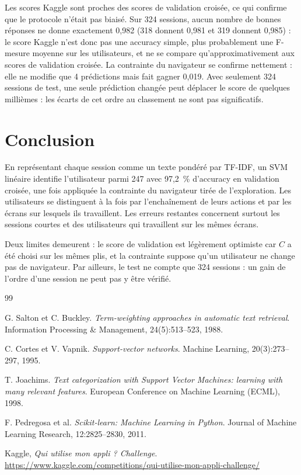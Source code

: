 \documentclass{rapportECL}
\begin{document}
Les scores Kaggle sont proches des scores de validation croisée, ce qui confirme que le protocole n'était pas biaisé. Sur 324 sessions, aucun nombre de bonnes réponses ne donne exactement 0,982 (318 donnent 0,981 et 319 donnent 0,985) : le score Kaggle n'est donc pas une accuracy simple, plus probablement une F-mesure moyenne sur les utilisateurs, et ne se compare qu'approximativement aux scores de validation croisée. La contrainte du navigateur se confirme nettement : elle ne modifie que 4 prédictions mais fait gagner 0,019. Avec seulement 324 sessions de test, une seule prédiction changée peut déplacer le score de quelques millièmes : les écarts de cet ordre au classement ne sont pas significatifs.

\section{Conclusion}

En représentant chaque session comme un texte pondéré par TF-IDF, un SVM linéaire identifie l'utilisateur parmi 247 avec 97,2~\% d'accuracy en validation croisée, une fois appliquée la contrainte du navigateur tirée de l'exploration. Les utilisateurs se distinguent à la fois par l'enchaînement de leurs actions et par les écrans sur lesquels ils travaillent. Les erreurs restantes concernent surtout les sessions courtes et des utilisateurs qui travaillent sur les mêmes écrans.

Deux limites demeurent : le score de validation est légèrement optimiste car $C$ a été choisi sur les mêmes plis, et la contrainte suppose qu'un utilisateur ne change pas de navigateur. Par ailleurs, le test ne compte que 324 sessions : un gain de l'ordre d'une session ne peut pas y être vérifié.

\begin{thebibliography}{99}

G. Salton et C. Buckley. \emph{Term-weighting approaches in automatic text retrieval}. Information Processing \& Management, 24(5):513--523, 1988.

C. Cortes et V. Vapnik. \emph{Support-vector networks}. Machine Learning, 20(3):273--297, 1995.

T. Joachims. \emph{Text categorization with Support Vector Machines: learning with many relevant features}. European Conference on Machine Learning (ECML), 1998.

F. Pedregosa et al. \emph{Scikit-learn: Machine Learning in Python}. Journal of Machine Learning Research, 12:2825--2830, 2011.

Kaggle, \emph{Qui utilise mon appli ? Challenge}.\\ \url{https://www.kaggle.com/competitions/qui-utilise-mon-appli-challenge/}

\end{thebibliography}
\end{document}
